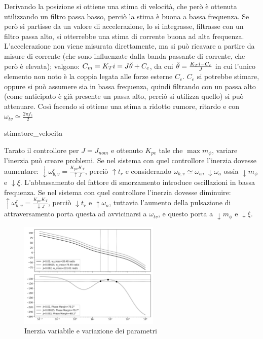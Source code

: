 Derivando la posizione si ottiene una stima di velocità, che però è ottenuta utilizzando un filtro passa basso, perciò la stima è buona a bassa frequenza.
Se però si partisse da un valore di accelerazione, lo si integrasse, filtrasse con un filtro passa alto, si otterrebbe una stima di corrente buona ad alta frequenza.
L'accelerazione non viene misurata direttamente, ma si può ricavare a partire da misure di corrente (che sono influenzate dalla banda passante di corrente, che però è elevata); valgono: \(C_m=K_T i= J \Ddot{\theta} + C_e\), da cui \(\Ddot{\theta} = \frac{K_T i - C_e}{J}\) in cui l'unico elemento non noto è la coppia legata alle forze esterne \(C_e\).
\(C_e\) si potrebbe stimare, oppure si può assumere sia in bassa frequenza, quindi filtrando con un passa alto (come anticipato è già presente un passa alto, perciò si utilizza quello) si può attenuare.
Così facendo si ottiene una stima a ridotto rumore, ritardo e con \(\omega_{tv}\simeq \frac{2\pi f_c}{2}\)

{stimatore_velocita}

Tarato il controllore per \(J=J_{nom}\) e ottenuto \(K_{pv}\) tale che \(\max{m_\phi}\), variare l'inerzia può creare problemi.
Se nel sistema con quel controllore l'inerzia dovesse aumentare: \(\downarrow \omega_{b,v}^r=\frac{K_{pv}K_T}{\uparrow J}\), perciò \(\uparrow t_r\) e considerando \(\omega_{b,v}\simeq \omega_a\), \(\downarrow \omega_a\) ossia \(\downarrow m_\phi\) e \(\downarrow \xi\). L'abbassamento del fattore di smorzamento introduce oscillazioni in bassa frequenza.
Se nel sistema con quel controllore l'inerzia dovesse diminuire: \(\uparrow \omega_{b,v}^r=\frac{K_{pv}K_T}{\downarrow J}\), perciò \(\downarrow t_r\) e \(\uparrow \omega_a\), tuttavia l'aumento della pulsazione di attraversamento porta questa ad avvicinarsi a \(\omega_{tv}\), e questo porta a \(\downarrow m_\phi\) e \(\downarrow \xi\).

\begin{figure}[h]
    \centering
    \includegraphics[width=0.6\textwidth]{Immagini/anello_velocita_J_variabile.png}
    \caption{Inerzia variabile e variazione dei parametri}
\end{figure}


